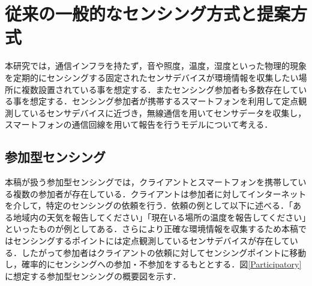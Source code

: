 \documentclass[submit,techrep]{ipsj}
\begin{document}




\section{従来の一般的なセンシング方式と提案方式}
本研究では，通信インフラを持たず，音や照度，温度，湿度といった物理的現象を定期的にセンシングする固定されたセンサデバイスが環境情報を収集したい場所に複数設置されている事を想定する．またセンシング参加者も多数存在している事を想定する．センシング参加者が携帯するスマートフォンを利用して定点観測しているセンサデバイスに近づき，無線通信を用いてセンサデータを収集し，スマートフォンの通信回線を用いて報告を行うモデルについて考える．

\subsection{参加型センシング}
本稿が扱う参加型センシングでは，クライアントとスマートフォンを携帯している複数の参加者が存在している．クライアントは参加者に対してインターネットを介して，特定のセンシングの依頼を行う．依頼の例として以下に述べる．「ある地域内の天気を報告してください」「現在いる場所の温度を報告してください」といったものが例としてある．さらにより正確な環境情報を収集するため本稿ではセンシングするポイントには定点観測しているセンサデバイスが存在している．したがって参加者はクライアントの依頼に対してセンシングポイントに移動し，確率的にセンシングへの参加・不参加をするもととする．図\ref{Participatory}に想定する参加型センシングの概要図を示す．
\end{document}
